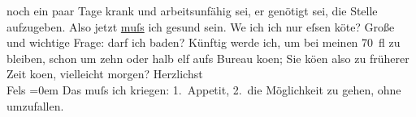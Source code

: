 \begin{ledgroupsized}[t]{13cm}
                    noch ein paar Tage krank und arbeitsunfähig sei, er genötigt sei, die Stelle
                    aufzugeben. Also jetzt \uline{muſs} ich gesund sein.
                        We{\geminationn} ich ich nur eſsen kö{\geminationn}te? Große und wichtige Frage: darf ich baden?\pend
           \pstart
           Künftig werde ich, um bei meinen 70 fl zu bleiben, schon um zehn oder halb elf
                    aufs Bureau ko{\geminationm}en; Sie kö{\geminationn}en also zu früherer Zeit ko{\geminationm}en, vielleicht morgen?\pend
           \pstart
           Herzlichst{\\[\baselineskip]}\spacefill\mbox{Fels}\pend
           \leftskip=0em{}\pstart
           \noindent{}Das muſs ich kriegen: 1. Appetit, 2. die Möglichkeit zu gehen, ohne
                        umzufallen.\pend
           \endnumbering{}\end{ledgroupsized}  \newcommand{\dateiname}{L00154}\newcommand{\titel}{Friedrich M. Fels an Arthur Schnitzler, [1. 1. 1893?]}\newcommand{\editorInnen}{Martin Anton Müller und Gerd-Hermann Susen}
      